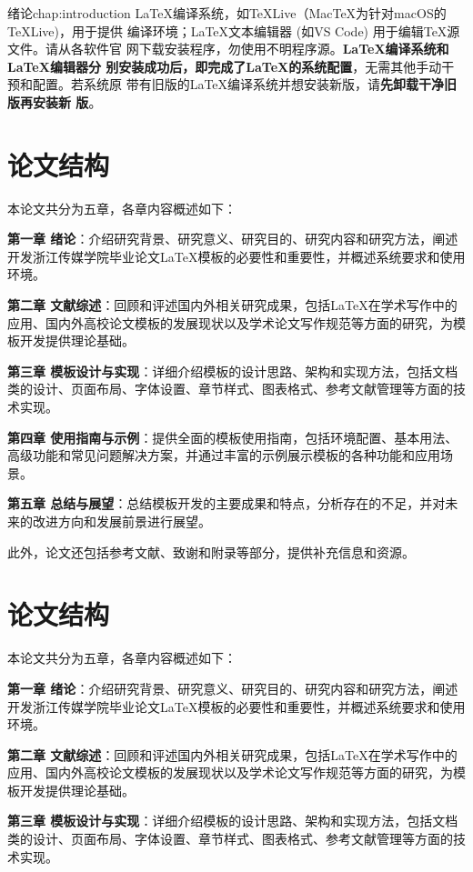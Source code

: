 \begin{cuzchapter}{绪论}{chap:introduction}
	\LaTeX{}编译系统，如\TeX{}Live（Mac\TeX{}为针对macOS的\TeX{}Live)，用于提供
	编译环境；\LaTeX{}文本编辑器 (如VS Code) 用于编辑\TeX{}源文件。请从各软件官
	网下载安装程序，勿使用不明程序源。\textbf{\LaTeX{}编译系统和\LaTeX{}编辑器分
	别安装成功后，即完成了\LaTeX{}的系统配置}，无需其他手动干预和配置。若系统原
	带有旧版的\LaTeX{}编译系统并想安装新版，请\textbf{先卸载干净旧版再安装新
	版}。

	\section{论文结构}\label{sec:structure}

	本论文共分为五章，各章内容概述如下：

	\textbf{第一章 绪论}：介绍研究背景、研究意义、研究目的、研究内容和研究方法，阐述开发浙江传媒学院毕业论文\LaTeX{}模板的必要性和重要性，并概述系统要求和使用环境。

	\textbf{第二章 文献综述}：回顾和评述国内外相关研究成果，包括\LaTeX{}在学术写作中的应用、国内外高校论文模板的发展现状以及学术论文写作规范等方面的研究，为模板开发提供理论基础。

	\textbf{第三章 模板设计与实现}：详细介绍模板的设计思路、架构和实现方法，包括文档类的设计、页面布局、字体设置、章节样式、图表格式、参考文献管理等方面的技术实现。

	\textbf{第四章 使用指南与示例}：提供全面的模板使用指南，包括环境配置、基本用法、高级功能和常见问题解决方案，并通过丰富的示例展示模板的各种功能和应用场景。

	\textbf{第五章 总结与展望}：总结模板开发的主要成果和特点，分析存在的不足，并对未来的改进方向和发展前景进行展望。

	此外，论文还包括参考文献、致谢和附录等部分，提供补充信息和资源。

	\section{论文结构}\label{sec:structure}

	本论文共分为五章，各章内容概述如下：

	\textbf{第一章 绪论}：介绍研究背景、研究意义、研究目的、研究内容和研究方法，阐述开发浙江传媒学院毕业论文\LaTeX{}模板的必要性和重要性，并概述系统要求和使用环境。

	\textbf{第二章 文献综述}：回顾和评述国内外相关研究成果，包括\LaTeX{}在学术写作中的应用、国内外高校论文模板的发展现状以及学术论文写作规范等方面的研究，为模板开发提供理论基础。

	\textbf{第三章 模板设计与实现}：详细介绍模板的设计思路、架构和实现方法，包括文档类的设计、页面布局、字体设置、章节样式、图表格式、参考文献管理等方面的技术实现。


\end{cuzchapter}
